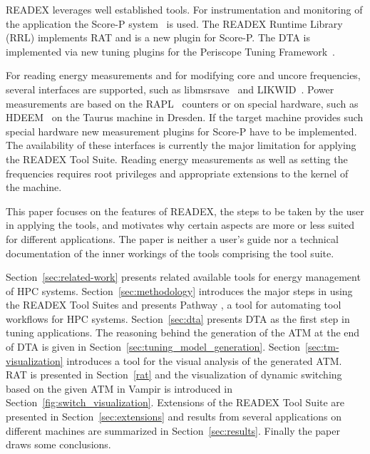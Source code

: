 \documentclass[runningheads]{llncs}
\begin{document}
READEX leverages well established tools. For instrumentation and monitoring of the application the Score-P system~\cite{knupfer2012score} is used. The READEX Runtime Library (RRL) implements RAT and is a new plugin for Score-P. The DTA is implemented via new tuning plugins for the Periscope Tuning Framework~\cite{PTF2.0IEEE2016}.  

For reading energy measurements and for modifying core and uncore frequencies, several interfaces are supported, such as libmsrsave~\cite{msrsave} and LIKWID~\cite{LIKWID}. Power measurements are based on the RAPL~\cite{Intel2018} counters or on special hardware, such as HDEEM~\cite{hdeem} on the Taurus machine in Dresden. If the target machine provides such special hardware new measurement plugins for Score-P have to be implemented. The availability of these interfaces is currently the major limitation for applying the READEX Tool Suite. Reading energy measurements as well as setting the frequencies requires root privileges and appropriate extensions to the kernel of the machine. 

This paper focuses on the features of READEX, the steps to be taken by the user in applying the tools, and motivates why certain aspects are more or less suited for different applications. The paper is neither a user's guide nor a technical documentation of the inner workings of the tools comprising the tool suite. 

Section~\ref{sec:related-work} presents related available tools for energy management of HPC systems. Section~\ref{sec:methodology} introduces the major steps in using the READEX Tool Suites and presents Pathway \cite{Pathway:Petkov13}, a tool for automating tool workflows for HPC systems. Section~\ref{sec:dta} presents DTA as the first step in tuning applications. The reasoning behind the generation of the ATM at the end of DTA is given in Section~\ref{sec:tuning_model_generation}. Section~\ref{sec:tm-visualization} introduces a tool for the visual analysis of the generated ATM. RAT is presented in Section~\ref{rat} and the visualization of dynamic switching based on the given ATM in Vampir is introduced in Section~\ref{fig:switch_visualization}. Extensions of the READEX Tool Suite are presented in Section~\ref{sec:extensions} and results from several applications on different machines are summarized in Section~\ref{sec:results}. Finally the paper draws some conclusions. 















\end{document}
